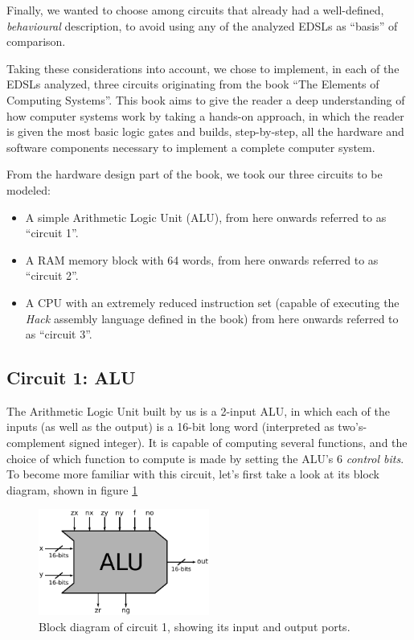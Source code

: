 \documentclass[a4paper]{article}
\begin{document}
        Finally, we wanted to choose among circuits that already had a well-defined,
        \emph{behavioural} description, to avoid using any of the analyzed EDSLs as ``basis'' of
        comparison.

        Taking these considerations into account, we chose to implement, in each of the EDSLs
        analyzed, three circuits originating from the book ``The Elements of Computing
        Systems''\cite{nand2tetris-book}. This book aims to give the reader a deep understanding of
        how computer systems work by taking a hands-on approach, in which the reader is given the
        most basic logic gates and builds, step-by-step, all the hardware and software components
        necessary to implement a complete computer system.

        From the hardware design part of the book, we took our three circuits to be modeled:

        \begin{itemize}
            \item A simple Arithmetic Logic Unit (ALU), from here onwards referred to
                as ``circuit 1''.
            \item A RAM memory block with 64 words, from here onwards referred to as ``circuit 2''.
            \item A CPU with an extremely reduced instruction set (capable of executing the
                \emph{Hack} assembly language defined in the book) from here onwards referred to as
                ``circuit 3''.
        \end{itemize}

        \subsection{Circuit 1: ALU}
        \label{subsec:circuit-alu}
            The Arithmetic Logic Unit built by us is a 2-input ALU, in which each of the inputs (as
            well as the output) is a 16-bit long word (interpreted as two's-complement signed
            integer). It is capable of computing several functions, and the choice of which
            function to compute is made by setting the ALU's 6 \emph{control bits}. To become more
            familiar with this circuit, let's first take a look at its block diagram, shown in
            figure \ref{fig:alu-block}

            \begin{figure}[h!]
                \centerline{\includegraphics[width=0.5\textwidth]{imgs/alu-block.pdf}}
                \caption{Block diagram of circuit 1, showing its input and output ports.
                    \label{fig:alu-block}}
            \end{figure}
\end{document}
